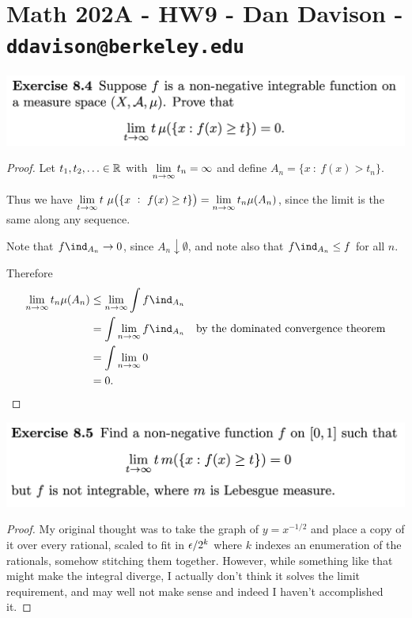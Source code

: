 \section*{Math 202A - HW9 - Dan Davison - \texttt{ddavison@berkeley.edu}}

\begin{mdframed}
\includegraphics[width=400pt]{img/analysis--berkeley-202a-hw09-210c.png}
\end{mdframed}

\begin{proof}
  Let $t_1, t_2, \ldots \in \mathbb{R}$ with $\limn t_n = \infty$ and define $A_n = \{x ~:~ f(x) > t_n\}$.

  Thus we have $\lim_{t\to\infty} t ~ \mu\big(\{x ~:~ f(x) \geq t\}\big) = \limn t_n \mu(A_n)$, since the limit
  is the same along any sequence.

  Note that $f\ind_{A_n} \to 0$, since $A_n \downarrow \emptyset$, and note also that $f\ind_{A_n} \leq f$ for
  all $n$.

  Therefore
  \begin{align*}
    \limn t_n \mu(A_n)
    &\leq \limn \int f\ind_{A_n} \\
    &= \int \limn f\ind_{A_n}             &\text{by the dominated convergence theorem}\\
    &= \int \limn 0 \\
    &= 0.
  \end{align*}
\end{proof}

\newpage
\begin{mdframed}
\includegraphics[width=400pt]{img/analysis--berkeley-202a-hw09-b0e8.png}
\end{mdframed}

\begin{proof}
  My original thought was to take the graph of $y = x^{-1/2}$ and place a copy of it over every rational,
  scaled to fit in $\epsilon/2^k$ where $k$ indexes an enumeration of the rationals, somehow stitching them
  together. However, while something like that might make the integral diverge, I actually don't think it
  solves the limit requirement, and may well not make sense and indeed I haven't accomplished it.
\end{proof}
\newpage

